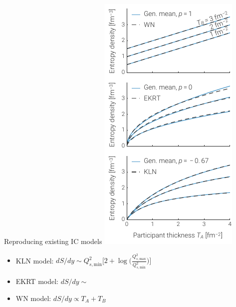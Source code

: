 \documentclass[xcolor=dvipsnames]{beamer}
\begin{document}
\begin{frame}{Reproducing existing IC models}
    \includegraphics{cgc_compare} \\
    \begin{itemize}
        \item KLN model: \quad $dS/dy \sim Q^2_{s,\text{min}} \Big[2 + \log \Big(\frac{Q^2_{s,\text{max}}}{Q^2_{s,\text{min}}}\Big) \Big]$
        \item EKRT model: \quad $dS/dy \sim$
        \item WN model: \quad $dS/dy \propto T_A + T_B$
    \end{itemize}
\end{frame}
\end{document}

